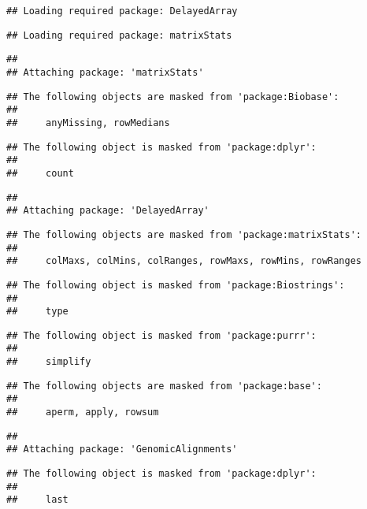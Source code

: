\documentclass[]{article}
\begin{document}
\begin{verbatim}
## Loading required package: DelayedArray
\end{verbatim}

\begin{verbatim}
## Loading required package: matrixStats
\end{verbatim}

\begin{verbatim}
## 
## Attaching package: 'matrixStats'
\end{verbatim}

\begin{verbatim}
## The following objects are masked from 'package:Biobase':
## 
##     anyMissing, rowMedians
\end{verbatim}

\begin{verbatim}
## The following object is masked from 'package:dplyr':
## 
##     count
\end{verbatim}

\begin{verbatim}
## 
## Attaching package: 'DelayedArray'
\end{verbatim}

\begin{verbatim}
## The following objects are masked from 'package:matrixStats':
## 
##     colMaxs, colMins, colRanges, rowMaxs, rowMins, rowRanges
\end{verbatim}

\begin{verbatim}
## The following object is masked from 'package:Biostrings':
## 
##     type
\end{verbatim}

\begin{verbatim}
## The following object is masked from 'package:purrr':
## 
##     simplify
\end{verbatim}

\begin{verbatim}
## The following objects are masked from 'package:base':
## 
##     aperm, apply, rowsum
\end{verbatim}

\begin{verbatim}
## 
## Attaching package: 'GenomicAlignments'
\end{verbatim}

\begin{verbatim}
## The following object is masked from 'package:dplyr':
## 
##     last
\end{verbatim}
\end{document}
